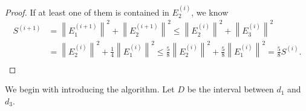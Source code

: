 \documentclass[11pt]{article}
\theoremstyle{plain}
\theoremstyle{definition}
\begin{document}
\begin{proof}
If at least one of them is contained in $E_2^{(i)}$, we know
\begin{equation*}
\begin{split}
    S^{(i+1)}&={\left\| E_1^{(i+1)}\right\|}^2+{\left\| E_2^{(i+1)}\right\|}^2
    \le{\left\| E_2^{(i)}\right\|}^2+{\left\| E_3^{(i)}\right\|}^2\\
    &={\left\| E_2^{(i)}\right\|}^2+\frac{1}{4}{\left\| E_1^{(i)}\right\|}^2
    \le \frac{5}{8}{\left\| E_2^{(i)}\right\|}^2+\frac{5}{8}{\left\| E_1^{(i)}\right\|}^2=\frac{5}{8}S^{(i)}.\\
    \end{split}
\end{equation*}


\end{proof}
\fi
    
We begin with introducing the algorithm. Let $D$ be the interval between $d_1$ and $d_3$. 
\end{document}
